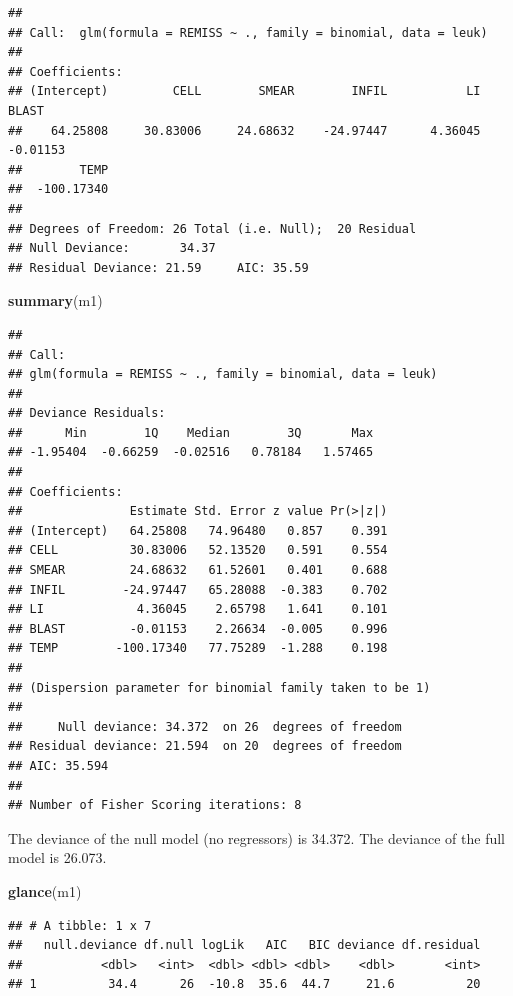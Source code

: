 \documentclass[
]{book}
\newenvironment{Shaded}{\begin{snugshade}}{\end{snugshade}}
\newcommand{\KeywordTok}[1]{\textcolor[rgb]{0.13,0.29,0.53}{\textbf{#1}}}
\newcommand{\NormalTok}[1]{#1}
\begin{document}
\begin{verbatim}
## 
## Call:  glm(formula = REMISS ~ ., family = binomial, data = leuk)
## 
## Coefficients:
## (Intercept)         CELL        SMEAR        INFIL           LI        BLAST  
##    64.25808     30.83006     24.68632    -24.97447      4.36045     -0.01153  
##        TEMP  
##  -100.17340  
## 
## Degrees of Freedom: 26 Total (i.e. Null);  20 Residual
## Null Deviance:       34.37 
## Residual Deviance: 21.59     AIC: 35.59
\end{verbatim}

\begin{Shaded}
\begin{Highlighting}[]
\KeywordTok{summary}\NormalTok{(m1)}
\end{Highlighting}
\end{Shaded}

\begin{verbatim}
## 
## Call:
## glm(formula = REMISS ~ ., family = binomial, data = leuk)
## 
## Deviance Residuals: 
##      Min        1Q    Median        3Q       Max  
## -1.95404  -0.66259  -0.02516   0.78184   1.57465  
## 
## Coefficients:
##               Estimate Std. Error z value Pr(>|z|)
## (Intercept)   64.25808   74.96480   0.857    0.391
## CELL          30.83006   52.13520   0.591    0.554
## SMEAR         24.68632   61.52601   0.401    0.688
## INFIL        -24.97447   65.28088  -0.383    0.702
## LI             4.36045    2.65798   1.641    0.101
## BLAST         -0.01153    2.26634  -0.005    0.996
## TEMP        -100.17340   77.75289  -1.288    0.198
## 
## (Dispersion parameter for binomial family taken to be 1)
## 
##     Null deviance: 34.372  on 26  degrees of freedom
## Residual deviance: 21.594  on 20  degrees of freedom
## AIC: 35.594
## 
## Number of Fisher Scoring iterations: 8
\end{verbatim}

The deviance of the null model (no regressors) is 34.372. The deviance of the full model is 26.073.

\begin{Shaded}
\begin{Highlighting}[]
\KeywordTok{glance}\NormalTok{(m1)}
\end{Highlighting}
\end{Shaded}

\begin{verbatim}
## # A tibble: 1 x 7
##   null.deviance df.null logLik   AIC   BIC deviance df.residual
##           <dbl>   <int>  <dbl> <dbl> <dbl>    <dbl>       <int>
## 1          34.4      26  -10.8  35.6  44.7     21.6          20
\end{verbatim}
\end{document}
